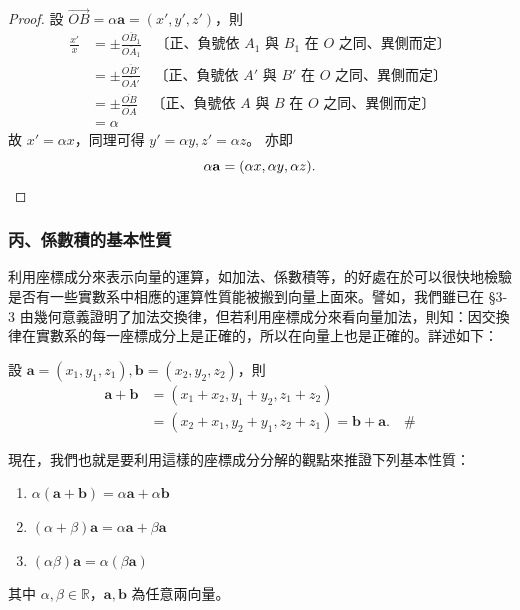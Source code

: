 \begin{proof}
設 $\vec{OB} = \alpha\mathbf{a} = (x', y', z')$，則
\begin{align*}
\frac{x'}{x} &= \pm \frac{\overline{OB_1}}{\overline{OA_1}} \quad \text{〔正、負號依 $A_1$ 與 $B_1$ 在 $O$ 之同、異側而定〕} \\
&= \pm \frac{\overline{OB'}}{\overline{OA'}} \quad \text{〔正、負號依 $A'$ 與 $B'$ 在 $O$ 之同、異側而定〕} \\
&= \pm \frac{\overline{OB}}{\overline{OA}} \quad \text{〔正、負號依 $A$ 與 $B$ 在 $O$ 之同、異側而定〕} \\
&= \alpha
\end{align*}
故 $x' = \alpha x$，同理可得 $y' = \alpha y, z' = \alpha z$。
亦即
\[ \alpha\mathbf{a} = (\alpha x, \alpha y, \alpha z). \qedhere \]
\end{proof}

\subsubsection*{丙、係數積的基本性質}

利用座標成分來表示向量的運算，如加法、係數積等，的好處在於可以很快地檢驗是否有一些實數系中相應的運算性質能被搬到向量上面來。譬如，我們雖已在 §3-3 由幾何意義證明了加法交換律，但若利用座標成分來看向量加法，則知：因交換律在實數系的每一座標成分上是正確的，所以在向量上也是正確的。詳述如下：

設 $\mathbf{a} = (x_1, y_1, z_1), \mathbf{b} = (x_2, y_2, z_2)$，則
\begin{align*}
\mathbf{a} + \mathbf{b} &= (x_1 + x_2, y_1 + y_2, z_1 + z_2) \\
&= (x_2 + x_1, y_2 + y_1, z_2 + z_1) = \mathbf{b} + \mathbf{a}. \quad \#
\end{align*}

現在，我們也就是要利用這樣的座標成分分解的觀點來推證下列基本性質：

\begin{proposition}
\begin{enumerate}[label=(\Roman*), leftmargin=2em]
  \item $\alpha(\mathbf{a} + \mathbf{b}) = \alpha\mathbf{a} + \alpha\mathbf{b}$
  \item $(\alpha + \beta)\mathbf{a} = \alpha\mathbf{a} + \beta\mathbf{a}$
  \item $(\alpha\beta)\mathbf{a} = \alpha(\beta\mathbf{a})$
\end{enumerate}
其中 $\alpha, \beta \in \mathbb{R}$，$\mathbf{a}, \mathbf{b}$ 為任意兩向量。
\end{proposition}


